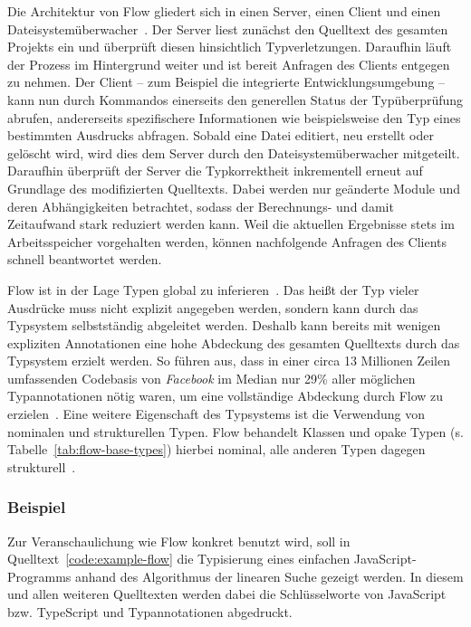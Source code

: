 Die Architektur von Flow gliedert sich in einen Server, einen Client und einen Dateisystemüberwacher~\autocite[22]{FLOW:PAPER}. Der Server liest zunächst den Quelltext des gesamten Projekts ein und überprüft diesen hinsichtlich Typverletzungen. Daraufhin läuft der Prozess im Hintergrund weiter und ist bereit Anfragen des Clients entgegen zu nehmen. Der Client -- zum Beispiel die integrierte Entwicklungsumgebung -- kann nun durch Kommandos einerseits den generellen Status der Typüberprüfung abrufen, andererseits spezifischere Informationen wie beispielsweise den Typ eines bestimmten Ausdrucks abfragen. Sobald eine Datei editiert, neu erstellt oder gelöscht wird, wird dies dem Server durch den Dateisystemüberwacher mitgeteilt. Daraufhin überprüft der Server die Typkorrektheit inkrementell erneut auf Grundlage des modifizierten Quelltexts. Dabei werden nur geänderte Module und deren Abhängigkeiten betrachtet, sodass der Berechnungs- und damit Zeitaufwand stark reduziert werden kann. Weil die aktuellen Ergebnisse stets im Arbeitsspeicher vorgehalten werden, können nachfolgende Anfragen des Clients schnell beantwortet werden.

Flow ist in der Lage Typen global zu inferieren~\autocite[25]{FLOW:PAPER}. Das heißt der Typ vieler Ausdrücke muss nicht explizit angegeben werden, sondern kann durch das Typsystem selbstständig abgeleitet werden. Deshalb kann bereits mit wenigen expliziten Annotationen eine hohe Abdeckung des gesamten Quelltexts durch das Typsystem erzielt werden. So führen \citeauthor{FLOW:PAPER} aus, dass in einer circa 13 Millionen Zeilen umfassenden Codebasis von \textit{Facebook} im Median nur 29\% aller möglichen Typannotationen nötig waren, um eine vollständige Abdeckung durch Flow zu erzielen~\autocite[24]{FLOW:PAPER}. Eine weitere Eigenschaft des Typsystems ist die Verwendung von nominalen und strukturellen Typen. Flow behandelt Klassen und opake Typen (s. Tabelle~\ref{tab:flow-base-types}) hierbei nominal, alle anderen Typen dagegen strukturell~\autocite{FLOW:NOMINAL_TYPES}.

\subsubsection{Beispiel}

Zur Veranschaulichung wie Flow konkret benutzt wird, soll in Quelltext~\ref{code:example-flow} die Typisierung eines einfachen JavaScript-Programms anhand des Algorithmus der linearen Suche gezeigt werden. In diesem und allen weiteren Quelltexten werden dabei die Schlüsselworte von JavaScript bzw. TypeScript  und Typannotationen  abgedruckt.

